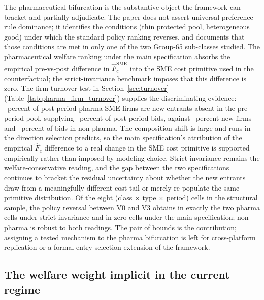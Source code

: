 The pharmaceutical bifurcation is the substantive object the framework can bracket and partially adjudicate. The paper does not assert universal preference-rule dominance; it identifies the conditions (thin protected pool, heterogeneous good) under which the standard policy ranking reverses, and documents that those conditions are met in only one of the two Group-65 sub-classes studied. The pharmaceutical welfare ranking under the main specification absorbs the empirical pre-vs-post difference in $\hat F_c^{\text{SME}}$ into the SME cost primitive used in the counterfactual; the strict-invariance benchmark imposes that this difference is zero. The firm-turnover test in Section~\ref{sec:turnover} (Table~\ref{tab:pharma_firm_turnover}) supplies the discriminating evidence: \turnoverPhPctNewFirms~percent of post-period pharma SME firms are new entrants absent in the pre-period pool, supplying \turnoverPhPctNewBids~percent of post-period bids, against \turnoverNpPctNewFirms~percent new firms and \turnoverNpPctNewBids~percent of bids in non-pharma. The composition shift is large and runs in the direction selection predicts, so the main specification's attribution of the empirical $\hat F_c$ difference to a real change in the SME cost primitive is supported empirically rather than imposed by modeling choice. Strict invariance remains the welfare-conservative reading, and the gap between the two specifications continues to bracket the residual uncertainty about whether the new entrants draw from a meaningfully different cost tail or merely re-populate the same primitive distribution. Of the eight (class $\times$ type $\times$ period) cells in the structural sample, the policy reversal between V0 and V3 obtains in exactly the two pharma cells under strict invariance and in zero cells under the main specification; non-pharma is robust to both readings. The pair of bounds is the contribution; assigning a tested mechanism to the pharma bifurcation is left for cross-platform replication or a formal entry-selection extension of the framework.

\subsection{The welfare weight implicit in the current regime}

